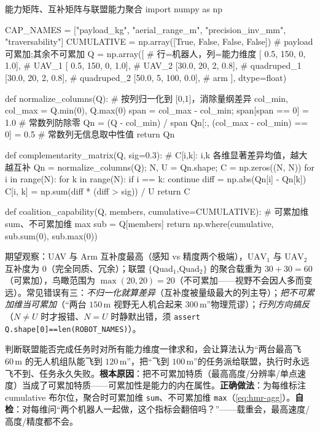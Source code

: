 \begin{codebox}[Python]{能力矩阵、互补矩阵与联盟能力聚合}
import numpy as np

CAP_NAMES  = ["payload_kg", "aerial_range_m", "precision_inv_mm", "traversability"]
CUMULATIVE = np.array([True, False, False, False])   # payload 可累加;其余不可累加
Q = np.array([                                       # 行=机器人，列=能力维度
    [ 0.5, 150,   0, 1.0],   # UAV_1
    [ 0.5, 150,   0, 1.0],   # UAV_2
    [30.0,  20,   2, 0.8],   # quadruped_1
    [30.0,  20,   2, 0.8],   # quadruped_2
    [50.0,   5, 100, 0.0],   # arm
], dtype=float)

def normalize_columns(Q):                            # 按列归一化到 [0,1]，消除量纲差异
    col_min, col_max = Q.min(0), Q.max(0)
    span = col_max - col_min; span[span == 0] = 1.0  # 常数列防除零
    Qn = (Q - col_min) / span
    Qn[:, (col_max - col_min) == 0] = 0.5            # 常数列无信息取中性值
    return Qn

def complementarity_matrix(Q, sig=0.3):              # C[i,k]: i,k 各维显著差异均值，越大越互补
    Qn = normalize_columns(Q); N, U = Qn.shape; C = np.zeros((N, N))
    for i in range(N):
        for k in range(N):
            if i == k: continue
            diff = np.abs(Qn[i] - Qn[k])
            C[i, k] = np.sum(diff * (diff > sig)) / U
    return C

def coalition_capability(Q, members, cumulative=CUMULATIVE):   # 可累加维 sum、不可累加维 max
    sub = Q[members]
    return np.where(cumulative, sub.sum(0), sub.max(0))
\end{codebox}

\noindent 期望观察：UAV 与 Arm 互补度最高（感知 vs 精度两个极端），$\mathrm{UAV}_1$ 与 $\mathrm{UAV}_2$ 互补度为 $0$（完全同质、冗余）；联盟 $\{$Quad$_1$,Quad$_2\}$ 的聚合载重为 $30+30=60$（可累加），鸟瞰范围为 $\max(20,20)=20$（不可累加——视野不会因人多而变远）。常见错误有三：\emph{不归一化就算差异}（互补度被量级最大的列主导）；\emph{把不可累加维当可累加}（“两台 $150\,\mathrm{m}$ 视野无人机合起来 $300\,\mathrm{m}$”物理荒谬）；\emph{行列方向搞反}（$N\ne U$ 时才报错、$N=U$ 时静默出错，须 \texttt{assert Q.\allowbreak shape[0]==len(ROBOT\_NAMES)}）。

\begin{pitfall}
判断联盟能否完成任务时对所有能力维度一律求和，会让算法认为“两台最高飞 $60\,\mathrm{m}$ 的无人机组队能飞到 $120\,\mathrm{m}$”，把“飞到 $100\,\mathrm{m}$”的任务派给联盟，执行时永远飞不到、任务永久失败。\textbf{根本原因}：把不可累加特质（最高高度/分辨率/单点速度）当成了可累加特质——可累加性是能力的内在属性。\textbf{正确做法}：为每维标注 cumulative 布尔位，聚合时可累加维 \texttt{sum}、不可累加维 \texttt{max}（\cref{eq:hmr-agg}）。\textbf{自检}：对每维问“两个机器人一起做，这个指标会翻倍吗？”——载重会，最高速度/高度/精度都不会。
\end{pitfall}

